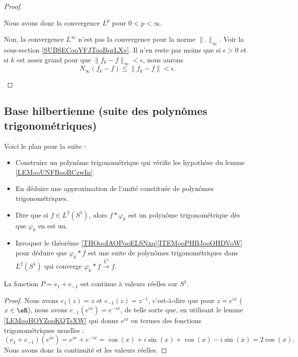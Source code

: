 \begin{proof}
\begin{subproof}
		Nous avons donc la convergence \( L^p\) pour \( 0<p<\infty\).

		Non, la convergence \( L^{\infty}\) n'est pas la convergence pour la norme \( \| . \|_{\infty}\). Voir la sous-section \ref{SUBSECooYFJTooBqrLXv}. Il n'en reste pas moins que si \( \epsilon>0\) et si \( k\) est assez grand pour que \( \| f_k-f \|_{\infty}<\epsilon\), nous aurons
		\begin{equation}
			N_{\infty}(f_k-f)\leq \| f_k-f \|<\epsilon.
		\end{equation}
	\end{subproof}
\end{proof}

\subsection{Base hilbertienne (suite des polynômes trigonométriques)}

Voici le plan pour la suite :
\begin{itemize}
	\item Construire un polynôme trigonométrique qui vérifie les hypothèse du lemme \ref{LEMooUNFBooRCzwIn}.
	\item En déduire une approximation de l'unité constituée de polynômes trigonométriques.
	\item Dire que si \( f\in L^2(S^1)\), alors \( f*\varphi_k\) est un polynôme trigonométrique dès que \( \varphi_k\) en est un.
	\item Invoquer le théorème \ref{THOooIAOPooELSNxq}\ref{ITEMooPHBJooOHDVoW} pour déduire que \( \varphi_k*f\) est une suite de polynômes trigonométriques dans \( L^2(S^1)\) qui converge \( \varphi_k*f\stackrel{L^2}{\longrightarrow}f\).
\end{itemize}

\begin{lemma}       \label{LEMooQQILooWlhntZ}
	La fonction \( P=e_1+e_{-1}\) est continue à valeurs réelles sur \( S^1\).
\end{lemma}

\begin{proof}
	Nous avons \( e_1(z)=z\) et \( e_{-1}(z)=z^{-1}\), c'est-à-dire que pour \( z= e^{ix}\) (\( x\in \eR\)), nous avons \( e_{-1}( e^{ix})= e^{-ix}\), de telle sorte que, en utilisant le lemme \ref{LEMooHOYZooKQTsXW} qui donne \(  e^{ix}\) en termes des fonctions trigonométriques usuelles :
	\begin{equation}
		(e_1+e_{-1})( e^{ix})= e^{ix}+ e^{-ix}=\cos(x)+i\sin(x)+\cos(x)-i\sin(x)=2\cos(x).
	\end{equation}
	Nous avons donc la continuité et les valeurs réelles.
\end{proof}

